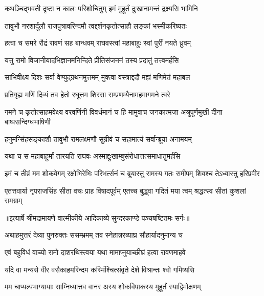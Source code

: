 \twolineshloka
{कथञ्चिद्भवती दृष्टा न कालः परिशोचितुम्}
{इमं मुहूर्तं दुःखानामन्तं द्रक्ष्यसि भामिनि} %

\twolineshloka
{तावुभौ नरशार्दूलौ राजपुत्रावरिन्दमौ}
{त्वद्दर्शनकृतोत्साहौ लङ्कां भस्मीकरिष्यतः} %

\twolineshloka
{हत्वा च समरे रौद्रं रावणं सह बान्धवम्}
{राघवस्त्वां महाबाहुः स्वां पुरीं नयते ध्रुवम्} %

\twolineshloka
{यत्तु रामो विजानीयादभिज्ञानमनिन्दिते}
{प्रीतिसंजननं तस्य प्रदातुं तत्त्वमर्हसि} %

\twolineshloka
{साभिवीक्ष्य दिशः सर्वा वेण्युद्ग्रथनमुत्तमम्}
{मुक्त्वा वस्त्राद्ददौ मह्यं मणिमेतं महाबल} %

\twolineshloka
{प्रतिगृह्य मणिं दिव्यं तव हेतो रघूत्तम}
{शिरसा सम्प्रणम्यैनामहमागमने त्वरे} %

\threelineshloka
{गमने च कृतोत्साहमवेक्ष्य वरवर्णिनी}
{विवर्धमानं च हि मामुवाच जनकात्मजा}
{अश्रुपूर्णमुखी दीना बाष्पसन्दिग्धभाषिणी} %

\twolineshloka
{हनुमन्सिंहसङ्काशौ तावुभौ रामलक्ष्मणौ}
{सुग्रीवं च सहामात्यं सर्वान्ब्रूया अनामयम्} %

\twolineshloka
{यथा च स महाबाहुर्मां तारयति राघवः}
{अस्माद्दुःखाम्बुसंरोधात्तत्समाधातुमर्हसि} %

\fourlineindentedshloka
{इमं च तीव्रं मम शोकवेगम्}
{रक्षोभिरेभिः परिभर्त्सनं च}
{ब्रूयास्तु रामस्य गतः समीपम्}
{शिवश्च तेऽध्वास्तु हरिप्रवीर} %

\fourlineindentedshloka
{एतत्तवार्या नृपराजसिंह}
{सीता वचः प्राह विषादपूर्वम्}
{एतच्च बुद्ध्वा गदितं मया त्वम्}
{श्रद्धत्स्व सीतां कुशलां समग्राम्} %


{॥इत्यार्षे श्रीमद्रामायणे वाल्मीकीये आदिकाव्ये सुन्दरकाण्डे पञ्चषष्टितमः सर्गः॥}


\twolineshloka
{अथाहमुत्तरं देव्या पुनरुक्तः ससम्भ्रमम्}
{तव स्नेहान्नरव्याघ्र सौहार्यादनुमान्य च} %

\twolineshloka
{एवं बहुविधं वाच्यो रामो दाशरथिस्त्वया}
{यथा मामाप्नुयाच्छीघ्रं हत्वा रावणमाहवे} %

\twolineshloka
{यदि वा मन्यसे वीर वसैकाहमरिन्दम}
{कस्मिंश्चित्संवृते देशे विश्रान्तः श्वो गमिष्यसि} %

\twolineshloka
{मम चाप्यल्पभाग्यायाः साम्निध्यात्तव वानर}
{अस्य शोकविपाकस्य मुहूर्तं स्याद्विमोक्षणम्} %

